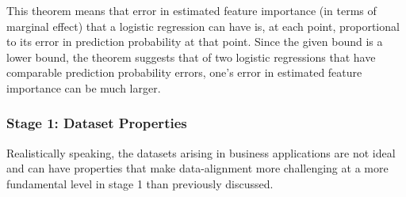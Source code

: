 \documentclass[mnsc,blindrev]{informs3}
\newcommand{\bx}{\mathbf{x}}
\begin{document}
    This theorem means that error in estimated feature importance (in terms of marginal effect) that a logistic regression can have is, at each point, proportional to its error in prediction probability at that point. Since the given bound is a lower bound, the theorem suggests that of two logistic regressions that have comparable prediction probability errors, one's error in estimated feature importance can be much larger. 
    
     \subsubsection{Stage 1: Dataset Properties}
         \label{sec:role_of_correlation}

         Realistically speaking, the datasets arising in business applications are not ideal and can have properties that make data-alignment more challenging at a more fundamental level in stage 1 than previously discussed. 
\end{document}
